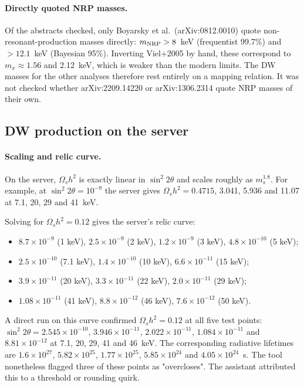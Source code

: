 \documentclass[11pt,a4paper]{article}
\begin{document}
\paragraph{Directly quoted NRP masses.} Of the abstracts checked, only Boyarsky et al.\ (arXiv:0812.0010) quote non-resonant-production masses directly: $m_{\rm NRP}>8$~keV (frequentist 99.7\%) and $>12.1$~keV (Bayesian 95\%). Inverting Viel+2005 by hand, these correspond to $m_x\approx1.56$ and 2.12~keV, which is weaker than the modern limits. The DW masses for the other analyses therefore rest entirely on a mapping relation. It was not checked whether arXiv:2209.14220 or arXiv:1306.2314 quote NRP masses of their own.

\subsection{DW production on the server}

\paragraph{Scaling and relic curve.} On the server, $\Omega_s h^2$ is exactly linear in $\sin^2 2\theta$ and scales roughly as $m_s^{1.8}$. For example, at $\sin^2 2\theta=10^{-9}$ the server gives $\Omega_s h^2 = 0.4715$, 3.041, 5.936 and 11.07 at 7.1, 20, 29 and 41~keV.

Solving for $\Omega_s h^2=0.12$ gives the server's relic curve:
\begin{itemize}
\item $8.7\times10^{-9}$ (1 keV), $2.5\times10^{-9}$ (2 keV), $1.2\times10^{-9}$ (3 keV), $4.8\times10^{-10}$ (5 keV);
\item $2.5\times10^{-10}$ (7.1 keV), $1.4\times10^{-10}$ (10 keV), $6.6\times10^{-11}$ (15 keV);
\item $3.9\times10^{-11}$ (20 keV), $3.3\times10^{-11}$ (22 keV), $2.0\times10^{-11}$ (29 keV);
\item $1.08\times10^{-11}$ (41 keV), $8.8\times10^{-12}$ (46 keV), $7.6\times10^{-12}$ (50 keV).
\end{itemize}

A direct run on this curve confirmed $\Omega_s h^2=0.12$ at all five test points: $\sin^2 2\theta=2.545\times10^{-10}$, $3.946\times10^{-11}$, $2.022\times10^{-11}$, $1.084\times10^{-11}$ and $8.81\times10^{-12}$ at 7.1, 20, 29, 41 and 46~keV. The corresponding radiative lifetimes are $1.6\times10^{27}$, $5.82\times10^{25}$, $1.77\times10^{25}$, $5.85\times10^{24}$ and $4.05\times10^{24}$~s. The tool nonetheless flagged three of these points as "overcloses". The assistant attributed this to a threshold or rounding quirk.
\end{document}
